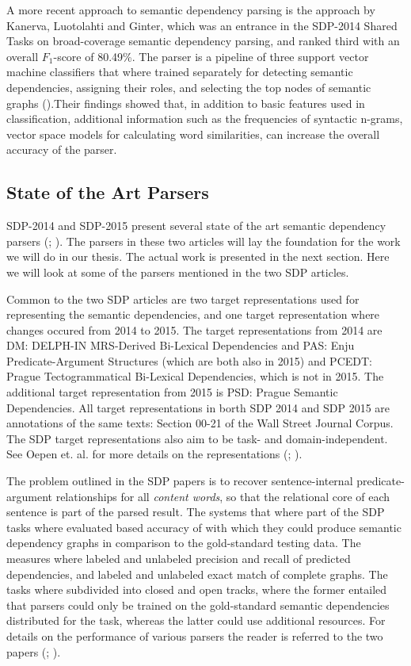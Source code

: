 \documentclass[10pt]{article}
\begin{document}
A more recent approach to semantic dependency parsing is the approach by Kanerva, Luotolahti and Ginter, which was an entrance in the SDP-2014 Shared Tasks on broad-coverage semantic dependency parsing, and ranked third with an overall $F_1$-score of 80.49\%. The parser is a pipeline of three support vector machine classifiers that where trained separately for detecting semantic dependencies, assigning their roles, and selecting the top nodes of semantic graphs (\cite{Turku}).Their findings showed that, in addition to basic features used in classification, additional information such as the frequencies of syntactic n-grams, vector space models for calculating word similarities, can increase the overall accuracy of the parser.

\subsection{State of the Art Parsers}
SDP-2014 and  SDP-2015 present several state of the art semantic dependency parsers (\cite{semeval2014}; \cite{semeval2015}). The parsers in these two articles will lay the foundation for the work we will do in our thesis. The actual work is presented in the next section. Here we will look at some of the parsers mentioned in the two SDP articles. 

Common to the two SDP articles are two target representations used for representing the semantic dependencies, and one target representation where changes occured from 2014 to 2015. The target representations from 2014 are DM: DELPH-IN MRS-Derived Bi-Lexical Dependencies and PAS: Enju Predicate-Argument Structures (which are both also in 2015) and PCEDT: Prague Tectogrammatical Bi-Lexical Dependencies, which is not in 2015. The additional target representation from 2015 is PSD: Prague Semantic Dependencies. All target representations in borth SDP 2014 and SDP 2015 are annotations of the same texts: Section 00-21 of the Wall Street Journal Corpus. The SDP target representations also aim to be task- and domain-independent. See Oepen et. al. for more details on the representations (\cite{semeval2014}; \cite{semeval2015}).

The problem outlined in the SDP papers is to recover sentence-internal predicate-argument relationships for all \textit{content words}, so that the relational core of each sentence is part of the parsed result. The systems that where part of the SDP tasks where evaluated based accuracy of with which they could produce semantic dependency graphs in comparison to the gold-standard testing data. The measures where labeled and unlabeled precision and recall of predicted dependencies, and labeled and unlabeled exact match of complete graphs. The tasks where subdivided into closed and open tracks, where the former entailed that parsers could only be trained on the gold-standard semantic dependencies distributed for the task, whereas the latter could use additional resources. For details on the performance of various parsers the reader is referred to the two papers (\cite{semeval2014}; \cite{semeval2015}). 
\end{document}
